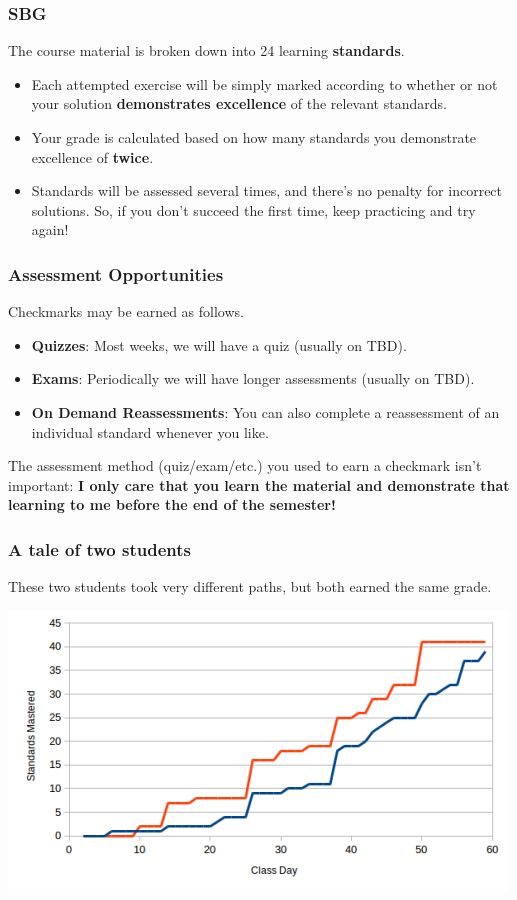 \documentclass[aspectratio=1610]{beamer}
\begin{document}
\begin{frame}\frametitle{SBG}
The course material is broken down into 24 learning \textbf{standards}.
\begin{itemize}
\item Each attempted exercise will be simply marked according to whether or not
      your solution \textbf{demonstrates excellence} of the relevant standards.
\item Your grade is calculated based on how many standards you demonstrate excellence of \textbf{twice}.
\item Standards will be assessed several times, and there's no penalty for
      incorrect solutions. So, if you don't succeed the first time,
      keep practicing and try again!
\end{itemize}
\end{frame}

\begin{frame}\frametitle{Assessment Opportunities}
Checkmarks may be earned as follows.
\begin{itemize}
\item {\bf Quizzes}: Most weeks, we will have a quiz (usually on TBD). 
\item {\bf Exams}: Periodically we will have longer assessments (usually on TBD).
\item {\bf On Demand Reassessments}: You can also complete a reassessment of an individual standard whenever you like.
\end{itemize}

\pause

\vspace{0.2in}

The assessment method (quiz/exam/etc.) you used to earn a checkmark
isn't important: \textbf{I only care that you
learn the material and demonstrate that learning to me before the end of the
semester!}
\end{frame}

\begin{frame}\frametitle{A tale of two students}
These two students took very different paths, but both earned the same grade.
\begin{center}
\includegraphics[scale=0.7]{student-comparison.png}
\end{center}
\end{frame}
\end{document}
